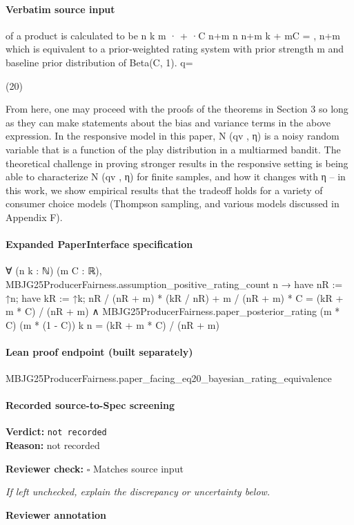 \documentclass[10pt]{article}
\newcommand{\reviewerbox}{%
  \par\noindent\fbox{\parbox{0.96\linewidth}{\rule{0pt}{0.38in}}}\par
}
\newcommand{\reviewmatch}[1]{%
  \par\noindent\textbf{Reviewer check:} $\square$\; #1\par
  \noindent\emph{If left unchecked, explain the discrepancy or uncertainty below.}\par
}
\begin{document}
\paragraph{Verbatim source input}
\begin{ReviewVerbatim}
of a product is calculated to be
n
k
m
· +
·C
n+m n n+m
k + mC
=
,
n+m
which is equivalent to a prior-weighted rating system
with prior strength m and baseline prior distribution of
Beta(C, 1).
q=

(20)

From here, one may proceed with the proofs of the theorems in Section 3 so long as they can make statements about
the bias and variance terms in the above expression. In the
responsive model in this paper, N (qv , η) is a noisy random
variable that is a function of the play distribution in a multiarmed bandit. The theoretical challenge in proving stronger
results in the responsive setting is being able to characterize N (qv , η) for finite samples, and how it changes with η
– in this work, we show empirical results that the tradeoff
holds for a variety of consumer choice models (Thompson
sampling, and various models discussed in Appendix F).
\end{ReviewVerbatim}


\paragraph{Expanded PaperInterface specification}
\begin{ReviewVerbatim}
∀ (n k : ℕ) (m C : ℝ),
  MBJG25ProducerFairness.assumption_positive_rating_count n →
    have nR := ↑n;
    have kR := ↑k;
    nR / (nR + m) * (kR / nR) + m / (nR + m) * C = (kR + m * C) / (nR + m) ∧
      MBJG25ProducerFairness.paper_posterior_rating (m * C) (m * (1 - C)) k n = (kR + m * C) / (nR + m)
\end{ReviewVerbatim}

\paragraph{Lean proof endpoint (built separately)}\begin{ReviewVerbatim}
MBJG25ProducerFairness.paper_facing_eq20_bayesian_rating_equivalence
\end{ReviewVerbatim}

\paragraph{Recorded source-to-Spec screening}
\textbf{Verdict:} \texttt{not recorded}
\\
\textbf{Reason:} not recorded
\reviewmatch{Matches source input}
\noindent\textbf{Reviewer annotation}\par
\reviewerbox
\clearpage
\hypertarget{source-claim-48bd38a1dccb3b5f}{}
\end{document}
